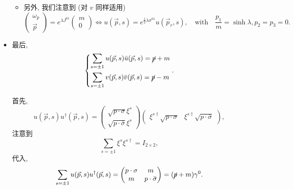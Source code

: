 \begin{itemize}
\begin{itemize}
		\item 另外, 我们注意到 (对 $v$ 同样适用)
		\begin{equation}
			\begin{pmatrix}
				\omega_p \\
				\vec{p}
			\end{pmatrix} = e^{\lambda J^{0 1}} \begin{pmatrix}
				m \\
				0
			\end{pmatrix} \iff u(\vec{p}, s) = e^{\frac{1}{2} \lambda \sigma^{0 1}} u(\vec{p}_r, s), \quad \text{with} \quad \frac{p_1}{m} = \sinh \lambda, p_2 = p_3 = 0.
		\end{equation}
	\end{itemize}
	
	\item 最后,
	\begin{equation}
		\begin{dcases}
			\sum_{s = \pm 1} u(\vec{p}, s) \bar{u}(\vec{p}, s) = \cancel{p} + m \\
			\sum_{s = \pm 1} v(\vec{p}, s) \bar{v}(\vec{p}, s) = \cancel{p} - m
		\end{dcases}.
	\end{equation}
	
	\begin{tcolorbox}[title=calculation:]
		首先,
		\begin{equation}
			u(\vec{p}, s) u^\dag(\vec{p}, s) = \begin{pmatrix}
				\sqrt{p \cdot \sigma} \xi^s \\
				\sqrt{p \cdot \bar{\sigma}} \xi^s
			\end{pmatrix} \begin{pmatrix}
				\xi^{s \dag} \sqrt{p \cdot \sigma} & \xi^{s \dag} \sqrt{p \cdot \bar{\sigma}}
			\end{pmatrix},
		\end{equation}
		注意到
		\begin{equation}
			\sum_{s = \pm 1} \xi^{s} \xi^{s \dag} = I_{2 \times 2},
		\end{equation}
		代入,
		\begin{equation}
			\sum_{s = \pm 1} u(\vec{p}, s) u^\dag(\vec{p}, s) = \begin{pmatrix}
				p \cdot \sigma & m \\
				m & p \cdot \bar{\sigma}
			\end{pmatrix} = (\cancel{p} + m) \gamma^0.
		\end{equation}
		

\end{tcolorbox}
\end{itemize}
